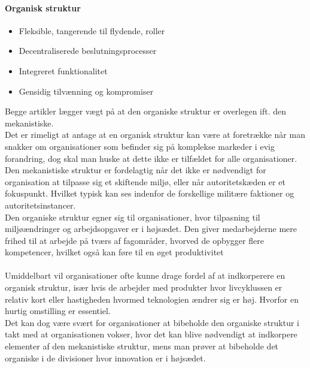 \paragraph{Organisk struktur}
\begin{itemize}
    \item Fleksible, tangerende til flydende, roller
    \item Decentraliserede beslutningsprocesser
    \item Integreret funktionalitet
    \item Gensidig tilvænning og kompromiser
\end{itemize}
Begge artikler lægger vægt på at den organiske struktur er overlegen ift. den mekanistiske.
\\Det er rimeligt at antage at en organisk struktur kan være at foretrække når man snakker om organisationer som befinder sig på komplekse markeder i evig forandring,
dog skal man huske at dette ikke er tilfældet for alle organisationer.
\\Den mekanistiske struktur er fordelagtig når det ikke er nødvendigt for organisation at tilpasse sig et skiftende miljø, eller når autoritetskæden er et fokuspunkt.
Hvilket typisk kan ses indenfor de forskellige militære faktioner og autoritetsinstancer.
\\Den organiske struktur egner sig til organisationer, hvor tilpasning til miljøændringer og arbejdsopgaver er i højsædet. Den giver medarbejderne mere frihed til at arbejde på tværs af fagområder,
hvorved de opbygger flere kompetencer, hvilket også kan føre til en øget produktivitet \cite[s. 132]{jones:2013}
\\~\\Umiddelbart vil organisationer ofte kunne drage fordel af at indkorperere en organisk struktur, især hvis de arbejder med produkter hvor livcyklussen er relativ kort eller hastigheden hvormed teknologien ændrer sig er høj.
Hvorfor en hurtig omstilling er essentiel.
\\Det kan dog være svært for organisationer at bibeholde den organiske struktur i takt med at organisationen vokser, hvor det kan blive nødvendigt at indkorpere elementer af den mekanistiske struktur, mens man prøver
at bibeholde det organiske i de divisioner hvor innovation er i højsædet.
